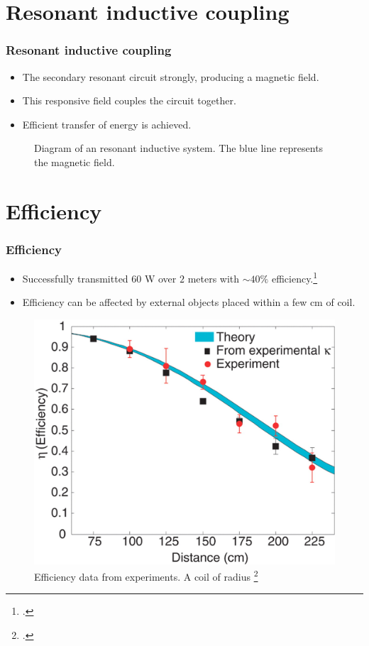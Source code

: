 \documentclass{beamer}
\begin{document}
\section{Resonant inductive coupling}
\begin{frame}
  \frametitle{Resonant inductive coupling}
  \begin{itemize}
    \item The secondary resonant circuit strongly, producing a magnetic field.
    \item This responsive field couples the circuit together.
    \item Efficient transfer of energy is achieved.
  \end{itemize}
  \begin{figure}
    
    \caption{Diagram of an resonant inductive system.
    The blue line represents the magnetic field.}
  \end{figure}
\end{frame}

\section{Efficiency}
\begin{frame}
  \frametitle{Efficiency}
  \begin{itemize}
    \item Successfully transmitted $60$ W over $2$ meters with $\sim40\%$ efficiency.\footcite{StrongCouple}
    \item Efficiency can be affected by external objects placed within a few cm of coil.
  \end{itemize}
  \begin{figure}
    \includegraphics[scale=0.1]{images/Experimental.jpg}
    \caption{Efficiency data from experiments. A coil of radius \footcite{StrongCouple}}
  \end{figure}
\end{frame}
\end{document}
